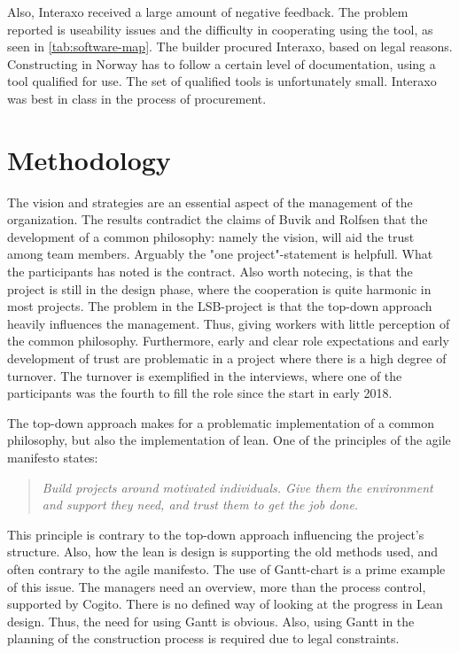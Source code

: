 Also, Interaxo received a large amount of negative feedback. The problem reported is useability issues and the difficulty in cooperating using the tool, as seen in \ref{tab:software-map}. The builder procured Interaxo, based on legal reasons. Constructing in Norway has to follow a certain level of documentation, using a tool qualified for use. The set of qualified tools is unfortunately small. Interaxo was best in class in the process of procurement. 

\section{Methodology}
The vision and strategies are an essential aspect of the management of the organization. The results contradict the claims of Buvik and Rolfsen \cite{rolfsen} that the development of a common philosophy: namely the vision, will aid the trust among team members. Arguably the "one project"-statement is helpfull. What the participants has noted is the contract. Also worth notecing, is that the project is still in the design phase, where the cooperation is quite harmonic in most projects. The problem in the LSB-project is that the top-down approach heavily influences the management. Thus, giving workers with little perception of the common philosophy. Furthermore, early and clear role expectations and early development of trust are problematic in a project where there is a high degree of turnover. The turnover is exemplified in the interviews, where one of the participants was the fourth to fill the role since the start in early 2018.
     
The top-down approach makes for a problematic implementation of a common philosophy, but also the implementation of lean. One of the principles of the agile manifesto \cite{agile_manifesto} states:
\begin{quote}
    \textit{Build projects around motivated individuals. Give them the environment and support they need, and trust them to get the job done.}
\end{quote}
    
This principle is contrary to the top-down approach influencing the project's structure. Also, how the lean is design is supporting the old methods used, and often contrary to the agile manifesto. The use of Gantt-chart is a prime example of this issue. The managers need an overview, more than the process control, supported by Cogito. There is no defined way of looking at the progress in Lean design. Thus, the need for using Gantt is obvious. Also, using Gantt in the planning of the construction process is required due to legal constraints. 

